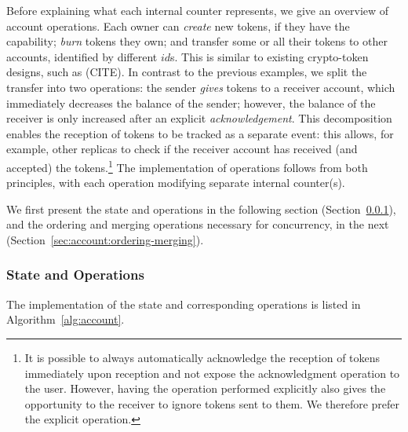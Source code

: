 \documentclass[9pt, oneside]{article}   	%
\begin{document}
Before explaining what each internal counter represents, we give an overview of account operations. Each owner can  \textit{create} new tokens, if they have the capability; \textit{burn} tokens they own; and transfer some or all their tokens to other accounts, identified by different $id$s. This is similar to existing crypto-token designs, such as (CITE). In contrast to the previous examples, we split the transfer into two operations: the sender \textit{gives} tokens to a receiver account, which immediately decreases the balance of the sender; however, the balance of the receiver is only increased after an explicit \textit{acknowledgement}. This decomposition enables the reception of tokens to be tracked as a separate event: this allows, for example, other replicas to check if the receiver account has received (and accepted) the tokens.\footnote{It is possible to always automatically acknowledge the reception of tokens immediately upon reception and not expose the acknowledgment operation to the user. However, having the operation performed explicitly also gives the opportunity to the receiver to ignore tokens sent to them. We therefore prefer the explicit operation.} The implementation of operations follows from both principles, with each operation modifying separate internal counter(s). 

We first present the state and operations in the following section (Section~\ref{sec:account:state-operations}), and the ordering and merging operations necessary for concurrency, in the next (Section~\ref{sec:account:ordering-merging}).

\subsubsection{State and Operations}
\label{sec:account:state-operations}

The implementation of the state and corresponding operations is listed in Algorithm~\ref{alg:account}. 
\end{document}
